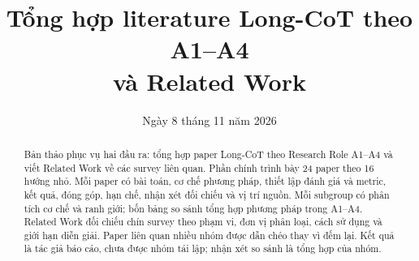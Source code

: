 \documentclass[11pt,a4paper]{article}
\title{\textbf{Tổng hợp literature Long-CoT theo A1--A4\\và Related Work}}
\author{}
\date{Ngày 8 tháng 11 năm 2026}
\begin{document}
\maketitle

\begin{abstract}
Bản thảo phục vụ hai đầu ra: tổng hợp paper Long-CoT theo Research Role A1--A4 và viết Related Work về các survey liên quan. Phần chính trình bày 24 paper theo 16 hướng nhỏ. Mỗi paper có bài toán, cơ chế phương pháp, thiết lập đánh giá và metric, kết quả, đóng góp, hạn chế, nhận xét đối chiếu và vị trí nguồn. Mỗi subgroup có phân tích cơ chế và ranh giới; bốn bảng so sánh tổng hợp phương pháp trong A1--A4. Related Work đối chiếu chín survey theo phạm vi, đơn vị phân loại, cách sử dụng và giới hạn diễn giải. Paper liên quan nhiều nhóm được dẫn chéo thay vì đếm lại. Kết quả là tác giả báo cáo, chưa được nhóm tái lập; nhận xét so sánh là tổng hợp của nhóm.
\end{abstract}

\vspace{1.5em}

\tableofcontents
\clearpage




\clearpage



\clearpage




\end{document}
